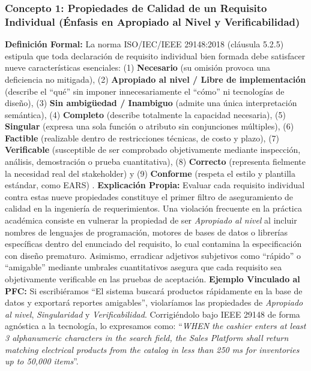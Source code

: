 \subsubsection{Concepto 1: Propiedades de Calidad de un Requisito Individual (Énfasis en Apropiado al Nivel y Verificabilidad)}
\textbf{Definición Formal:} La norma ISO/IEC/IEEE 29148:2018 (cláusula 5.2.5) estipula que toda declaración de requisito individual bien formada debe satisfacer nueve características esenciales: (1) \textbf{Necesario} (su omisión provoca una deficiencia no mitigada), (2) \textbf{Apropiado al nivel / Libre de implementación} (describe el ``qué'' sin imponer innecesariamente el ``cómo'' ni tecnologías de diseño), (3) \textbf{Sin ambigüedad / Inambiguo} (admite una única interpretación semántica), (4) \textbf{Completo} (describe totalmente la capacidad necesaria), (5) \textbf{Singular} (expresa una sola función o atributo sin conjunciones múltiples), (6) \textbf{Factible} (realizable dentro de restricciones técnicas, de costo y plazo), (7) \textbf{Verificable} (susceptible de ser comprobado objetivamente mediante inspección, análisis, demostración o prueba cuantitativa), (8) \textbf{Correcto} (representa fielmente la necesidad real del stakeholder) y (9) \textbf{Conforme} (respeta el estilo y plantilla estándar, como EARS) \cite{ieee29148, pohl2025}.
\textbf{Explicación Propia:} Evaluar cada requisito individual contra estas nueve propiedades constituye el primer filtro de aseguramiento de calidad en la ingeniería de requerimientos. Una violación frecuente en la práctica académica consiste en vulnerar la propiedad de ser \textit{Apropiado al nivel} al incluir nombres de lenguajes de programación, motores de bases de datos o librerías específicas dentro del enunciado del requisito, lo cual contamina la especificación con diseño prematuro. Asimismo, erradicar adjetivos subjetivos como ``rápido'' o ``amigable'' mediante umbrales cuantitativos asegura que cada requisito sea objetivamente verificable en las pruebas de aceptación.
\textbf{Ejemplo Vinculado al PFC:} Si escribiéramos ``El sistema buscará productos rápidamente en la base de datos y exportará reportes amigables'', violaríamos las propiedades de \textit{Apropiado al nivel}, \textit{Singularidad} y \textit{Verificabilidad}. Corrigiéndolo bajo IEEE 29148 de forma agnóstica a la tecnología, lo expresamos como: ``\textit{WHEN the cashier enters at least 3 alphanumeric characters in the search field, the Sales Platform shall return matching electrical products from the catalog in less than 250 ms for inventories up to 50,000 items}''.
